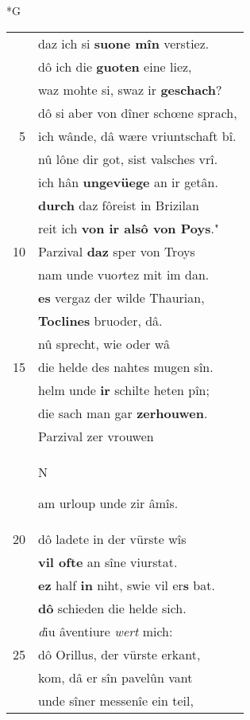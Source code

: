\documentclass[8pt,a4paper,notitlepage]{article}
\begin{document}
\newpage
\begin{table}[ht]
\begin{minipage}[t]{0.5\linewidth}
\small
\begin{center}*G
\end{center}
\begin{tabular}{rl}
 & daz ich si \textbf{suone mîn} verstiez.\\ 
 & dô ich die \textbf{guoten} eine liez,\\ 
 & waz mohte si, swaz ir \textbf{geschach}?\\ 
 & dô si aber von dîner schœne sprach,\\ 
5 & ich wânde, dâ wære vriuntschaft bî.\\ 
 & nû lône dir got, sist valsches vrî.\\ 
 & ich hân \textbf{ungevüege} an ir getân.\\ 
 & \textbf{durch} daz fôreist in Brizilan\\ 
 & reit ich \textbf{von ir alsô von Poys}."\\ 
10 & Parzival \textbf{daz} sper von Troys\\ 
 & nam unde vuo\textit{r}tez mit im dan.\\ 
 & \textbf{es} vergaz der wilde Thaurian,\\ 
 & \textbf{Toclines} bruoder, dâ.\\ 
 & nû sprecht, wie oder wâ\\ 
15 & die helde des nahtes mugen sîn.\\ 
 & helm unde \textbf{ir} schilte heten pîn;\\ 
 & die sach man gar \textbf{zerhouwen}.\\ 
 & Parzival zer vrouwen\\ 
 & \begin{large}N\end{large}am urloup unde zir âmîs.\\ 
20 & dô ladete in der vürste wîs\\ 
 & \textbf{vil ofte} an sîne viurstat.\\ 
 & \textbf{ez} half \textbf{in} niht, swie vil er\textbf{s} bat.\\ 
 & \textbf{dô} schieden die helde sich.\\ 
 & \textit{d}iu âventiure \textit{wert} mich:\\ 
25 & dô Orillus, der vürste erkant,\\ 
 & kom, dâ er sîn pavelûn vant\\ 
 & unde sîner messenîe ein teil,\\ 

\end{tabular}
\end{minipage}
\end{table}
\end{document}
